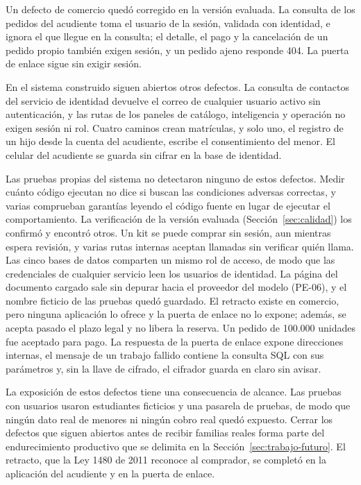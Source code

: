 Un defecto de comercio quedó corregido en la versión evaluada. La consulta de los pedidos del
acudiente toma el usuario de la sesión, validada con identidad, e ignora el que llegue en la
consulta; el detalle, el pago y la cancelación de un pedido propio también exigen sesión, y un
pedido ajeno responde 404. La puerta de enlace sigue sin exigir sesión.

En el sistema construido siguen abiertos otros defectos. La consulta de contactos del servicio de identidad devuelve el correo de
cualquier usuario activo sin autenticación, y las rutas de los paneles de catálogo, inteligencia y
operación no exigen sesión ni rol. Cuatro caminos crean matrículas, y solo uno, el registro de un
hijo desde la cuenta del acudiente, escribe el consentimiento del menor. El celular del acudiente se
guarda sin cifrar en la base de identidad.

Las pruebas propias del sistema no detectaron ninguno de estos defectos. Medir cuánto código
ejecutan no dice si buscan las condiciones adversas correctas, y varias comprueban garantías leyendo
el código fuente en lugar de ejecutar el comportamiento. La verificación de la versión evaluada
(Sección~\ref{sec:calidad}) los confirmó y encontró otros. Un kit se puede comprar sin sesión, aun
mientras espera revisión, y varias rutas internas aceptan llamadas sin verificar quién llama. Las
cinco bases de datos comparten un mismo rol de acceso, de modo que las credenciales de cualquier
servicio leen los usuarios de identidad. La página del documento cargado sale sin depurar hacia el
proveedor del modelo (\mbox{PE-06}), y el nombre ficticio de las pruebas quedó guardado. El retracto existe
en comercio, pero ninguna aplicación lo ofrece y la puerta de enlace no lo expone; además, se acepta
pasado el plazo legal y no libera la reserva. Un pedido de 100.000 unidades fue aceptado para pago.
La respuesta de la puerta de enlace expone direcciones internas, el mensaje de un trabajo fallido
contiene la consulta SQL con sus parámetros y, sin la llave de cifrado, el cifrador guarda en claro
sin avisar.

La exposición de estos defectos tiene una consecuencia de alcance. Las pruebas con usuarios usaron
estudiantes ficticios y una pasarela de pruebas, de modo que ningún dato real de menores ni ningún
cobro real quedó expuesto. Cerrar los defectos que siguen abiertos antes de recibir familias reales
forma parte del endurecimiento productivo que se delimita en la
Sección~\ref{sec:trabajo-futuro}. El retracto, que la Ley 1480 de 2011 reconoce al comprador, se
completó en la aplicación del acudiente y en la puerta de enlace.

